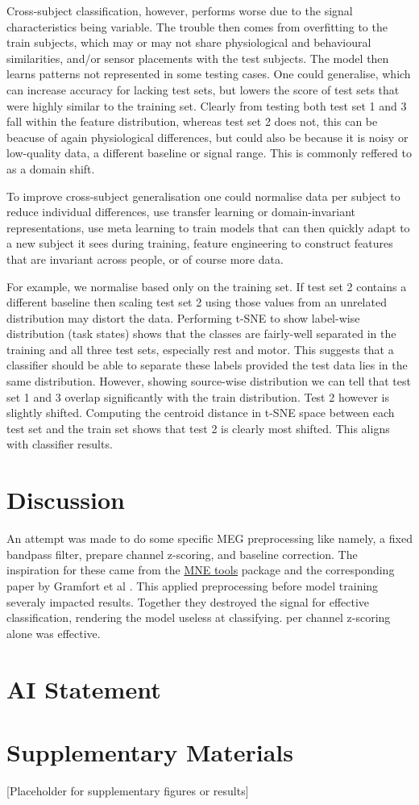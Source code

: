 \documentclass[conference]{IEEEtran}
\begin{document}
Cross-subject classification, however, performs worse due to the signal characteristics being variable. The trouble then comes from overfitting to the train subjects, which may or may not share physiological and behavioural similarities, and/or sensor placements with the test subjects. The model then learns patterns not represented in some testing cases. One could generalise, which can increase accuracy for lacking test sets, but lowers the score of test sets that were highly similar to the training set. Clearly from testing both test set 1 and 3 fall within the feature distribution, whereas test set 2 does not, this can be beacuse of again physiological differences, but could also be because it is noisy or low-quality data, a different baseline or signal range. This is commonly reffered to as a domain shift.

To improve cross-subject generalisation one could normalise data per subject to reduce individual differences, use transfer learning or domain-invariant representations, use meta learning to train models that can then quickly adapt to a new subject it sees during training, feature engineering to construct features that are invariant across people, or of course more data.

For example, we normalise based only on the training set. If test set 2 contains a different baseline then scaling test set 2 using those values from an unrelated distribution may distort the data. Performing t-SNE to show label-wise distribution (task states) shows that the classes are fairly-well separated in the training and all three test sets, especially rest and motor. This suggests that a classifier should be able to separate these labels provided the test data lies in the same distribution. However, showing source-wise distribution we can tell that test set 1 and 3 overlap significantly with the train distribution. Test 2 however is slightly shifted. Computing the centroid distance in t-SNE space between each test set and the train set shows that test 2 is clearly most shifted. This aligns with classifier results. 

\section{Discussion}
An attempt was made to do some specific MEG preprocessing like namely, a fixed bandpass filter, prepare
channel z-scoring, and baseline correction. The inspiration for these came from the 
\href{https://mne.tools/stable/index.html}{MNE tools} package and the corresponding paper by Gramfort et al 
\cite{gramfort2013meg}. This applied preprocessing before model training severaly impacted results.
Together they destroyed the signal for effective classification, rendering the model useless at 
classifying. per channel z-scoring alone was effective.

\section*{AI Statement}




\section*{Supplementary Materials}
[Placeholder for supplementary figures or results]

\clearpage
\onecolumn
\end{document}
